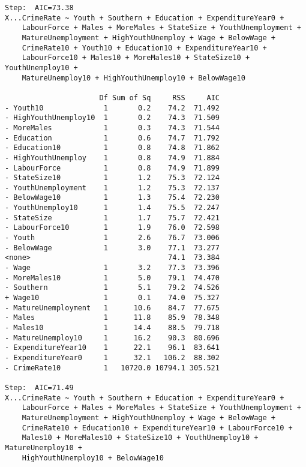 \documentclass[11pt]{article}
\begin{document}
\begin{enumerate}
\begin{verbatim}
Step:  AIC=73.38
X...CrimeRate ~ Youth + Southern + Education + ExpenditureYear0 + 
    LabourForce + Males + MoreMales + StateSize + YouthUnemployment + 
    MatureUnemployment + HighYouthUnemploy + Wage + BelowWage + 
    CrimeRate10 + Youth10 + Education10 + ExpenditureYear10 + 
    LabourForce10 + Males10 + MoreMales10 + StateSize10 + YouthUnemploy10 + 
    MatureUnemploy10 + HighYouthUnemploy10 + BelowWage10

                      Df Sum of Sq     RSS     AIC
- Youth10              1       0.2    74.2  71.492
- HighYouthUnemploy10  1       0.2    74.3  71.509
- MoreMales            1       0.3    74.3  71.544
- Education            1       0.6    74.7  71.792
- Education10          1       0.8    74.8  71.862
- HighYouthUnemploy    1       0.8    74.9  71.884
- LabourForce          1       0.8    74.9  71.899
- StateSize10          1       1.2    75.3  72.124
- YouthUnemployment    1       1.2    75.3  72.137
- BelowWage10          1       1.3    75.4  72.230
- YouthUnemploy10      1       1.4    75.5  72.247
- StateSize            1       1.7    75.7  72.421
- LabourForce10        1       1.9    76.0  72.598
- Youth                1       2.6    76.7  73.006
- BelowWage            1       3.0    77.1  73.277
<none>                                74.1  73.384
- Wage                 1       3.2    77.3  73.396
- MoreMales10          1       5.0    79.1  74.470
- Southern             1       5.1    79.2  74.526
+ Wage10               1       0.1    74.0  75.327
- MatureUnemployment   1      10.6    84.7  77.675
- Males                1      11.8    85.9  78.348
- Males10              1      14.4    88.5  79.718
- MatureUnemploy10     1      16.2    90.3  80.696
- ExpenditureYear10    1      22.1    96.1  83.641
- ExpenditureYear0     1      32.1   106.2  88.302
- CrimeRate10          1   10720.0 10794.1 305.521

Step:  AIC=71.49
X...CrimeRate ~ Youth + Southern + Education + ExpenditureYear0 + 
    LabourForce + Males + MoreMales + StateSize + YouthUnemployment + 
    MatureUnemployment + HighYouthUnemploy + Wage + BelowWage + 
    CrimeRate10 + Education10 + ExpenditureYear10 + LabourForce10 + 
    Males10 + MoreMales10 + StateSize10 + YouthUnemploy10 + MatureUnemploy10 + 
    HighYouthUnemploy10 + BelowWage10


\end{verbatim}
\end{enumerate}
\end{document}
